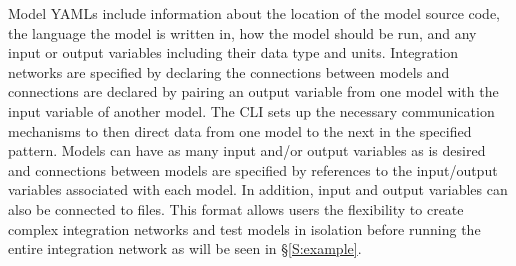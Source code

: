 \documentclass[journal]{IEEEtran}
\newcommand{\todo}[1]{{\color{red}{#1}}}
\newcommand{\pkg}{{\tt \todo{cis\_interface}}{}}
\newcommand{\A}{Appendix{ }}
\newcommand{\rootyml}{}
\newcommand{\shootyml}{}
\newcommand{\intyml}{}
\begin{document}
Model YAMLs include information about the location of the model source code, the language the model is written in, how the model should be run, and any input or output variables including their data type and units. 
%
%
%
%
Integration networks are specified by declaring the connections between models and connections are declared by pairing an output variable from one model with the input variable of another model. The {\pkg} CLI sets up the necessary communication mechanisms to then direct data from one model to the next in the specified pattern. Models can have as many input and/or output variables as is desired and connections between models are specified by references to the input/output variables associated with each model. In addition, input and output variables can also be connected to files.
%
%
%
This format allows users the flexibility to create complex integration networks and test models in isolation before running the entire integration network as will be seen in \S\ref{S:example}.


\end{document}
